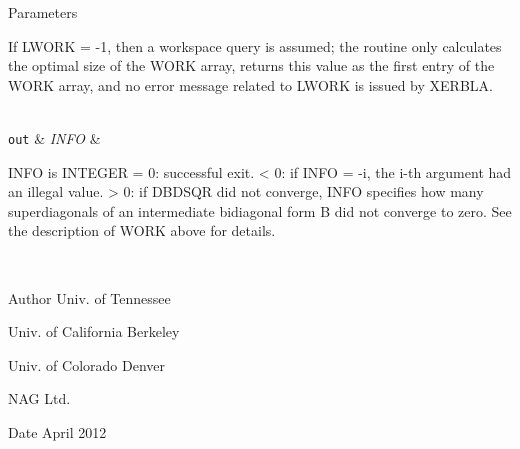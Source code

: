 \begin{DoxyParams}[1]{Parameters}
\begin{DoxyVerb}
          If LWORK = -1, then a workspace query is assumed; the routine
          only calculates the optimal size of the WORK array, returns
          this value as the first entry of the WORK array, and no error
          message related to LWORK is issued by XERBLA.\end{DoxyVerb}
\\
\hline
\mbox{\tt out}  & {\em I\+N\+F\+O} & \begin{DoxyVerb}          INFO is INTEGER
          = 0:  successful exit.
          < 0:  if INFO = -i, the i-th argument had an illegal value.
          > 0:  if DBDSQR did not converge, INFO specifies how many
                superdiagonals of an intermediate bidiagonal form B
                did not converge to zero. See the description of WORK
                above for details.\end{DoxyVerb}
 \\
\hline
\end{DoxyParams}
\begin{DoxyAuthor}{Author}
Univ. of Tennessee 

Univ. of California Berkeley 

Univ. of Colorado Denver 

N\+A\+G Ltd. 
\end{DoxyAuthor}
\begin{DoxyDate}{Date}
April 2012 
\end{DoxyDate}
